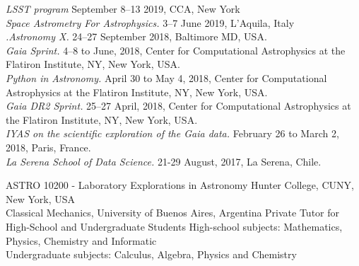 \documentclass[10pt]{cv}
\begin{document}
\begin{llist}

\textit{LSST program} September 8--13 2019, CCA, New York\\
\textit{Space Astrometry For Astrophysics.} 3--7 June 2019, L'Aquila, Italy\\
\textit{.Astronomy X.} 24--27 September 2018, Baltimore MD, USA.\\
\textit{Gaia Sprint.} 4--8 to June, 2018, Center for Computational Astrophysics at the Flatiron Institute, NY, New York, USA.\\
\textit{Python in Astronomy.}  April 30 to May 4, 2018, Center for Computational Astrophysics at the Flatiron Institute, NY, New York, USA. \\
\textit{Gaia DR2 Sprint.} 25--27 April, 2018, Center for Computational Astrophysics at the Flatiron Institute, NY, New York, USA. \\
\textit{IYAS on the scientific exploration of the Gaia data.} February 26 to March 2, 2018, Paris, France.\\
\textit{La Serena School of Data Science.} 21-29 August, 2017, La Serena, Chile.



ASTRO 10200 - Laboratory Explorations in Astronomy
Hunter College, CUNY, New York, USA\\
Classical Mechanics, University of Buenos Aires, Argentina
Private Tutor for High-School and Undergraduate Students
High-school subjects: Mathematics, Physics, Chemistry and Informatic\\
Undergraduate subjects: Calculus, Algebra, Physics and Chemistry 


\end{llist}
\end{document}
